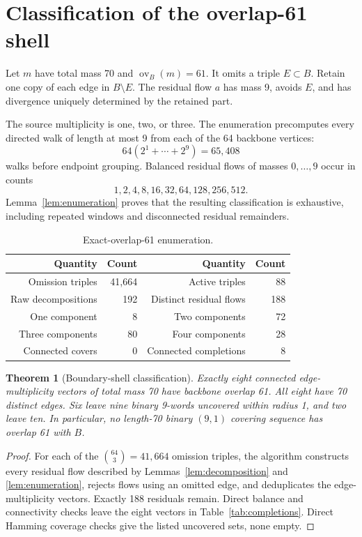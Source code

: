 \documentclass[11pt]{article}
\newtheorem{theorem}{Theorem}
\theoremstyle{definition}
\theoremstyle{remark}
\newcommand{\ov}{\operatorname{ov}}
\begin{document}
\section{Classification of the overlap-61 shell}

Let $m$ have total mass 70 and $\ov_B(m)=61$.  It omits a triple
$E\subset B$.  Retain one copy of each edge in $B\setminus E$.  The
residual flow $a$ has mass 9, avoids $E$, and has divergence uniquely
determined by the retained part.

The source multiplicity is one, two, or three.  The enumeration
precomputes every directed walk of length at most 9 from each of the 64
backbone vertices:
\[
  64(2^1+\cdots+2^9)=65{,}408
\]
walks before endpoint grouping.  Balanced residual flows of masses
$0,\ldots,9$ occur in counts
\[
  1,2,4,8,16,32,64,128,256,512.
\]
Lemma~\ref{lem:enumeration} proves that the resulting classification is
exhaustive, including repeated windows and disconnected residual
remainders.

\begin{table}[ht]
\centering
\begin{tabular}{@{}r r r r@{}}
\toprule
Quantity & Count & Quantity & Count\\
\midrule
Omission triples & 41,664 & Active triples & 88\\
Raw decompositions & 192 & Distinct residual flows & 188\\
One component & 8 & Two components & 72\\
Three components & 80 & Four components & 28\\
Connected covers & 0 & Connected completions & 8\\
\bottomrule
\end{tabular}
\caption{Exact-overlap-61 enumeration.}
\label{tab:enumeration}
\end{table}

\begin{theorem}[Boundary-shell classification]
\label{thm:shell}
Exactly eight connected edge-multiplicity vectors of total mass 70 have
backbone overlap 61.  All eight have 70 distinct edges.  Six leave nine
binary 9-words uncovered within radius 1, and two leave ten.  In
particular, no length-70 binary $(9,1)$ covering sequence has overlap 61
with $B$.
\end{theorem}

\begin{proof}
For each of the $\binom{64}{3}=41{,}664$ omission triples, the algorithm
constructs every residual flow described by
Lemmas~\ref{lem:decomposition} and \ref{lem:enumeration}, rejects flows
using an omitted edge, and deduplicates the edge-multiplicity vectors.
Exactly 188 residuals remain.  Direct balance and connectivity checks
leave the eight vectors in Table~\ref{tab:completions}.  Direct Hamming
coverage checks give the listed uncovered sets, none empty.
\end{proof}
\end{document}
